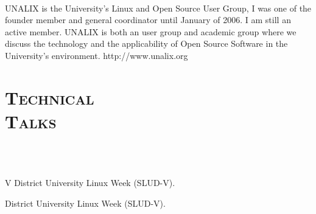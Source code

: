 \begin{resume}
\begin{formatb}
  \body\\
\end{formatb}

\begin{position}
UNALIX is the University's Linux and Open Source User Group, I was one
of the founder member  and general coordinator until January of
2006. I am still an active member. UNALIX is both an user group and academic group where we
discuss the technology and the applicability of Open Source Software
in the University's environment. http://www.unalix.org
\end{position}
\newline     
\newline
\newline
\newline     
\newline
\newline     
\newline
\newline     


\section{\textsc{Technical \\ Talks}}

\begin{formatb}
  \\
  \\
   \body
\end{formatb}

\begin{position}
V District University Linux Week (SLUD-V).
\end{position}

\begin{position}
District  University Linux Week (SLUD-V).
\end{position}


\end{resume}
